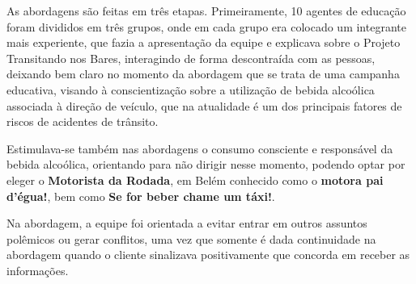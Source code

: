 As abordagens são feitas em três etapas. Primeiramente, 10 agentes de educação foram divididos em três grupos, onde em cada grupo era colocado um integrante mais experiente, que fazia a apresentação da equipe e explicava sobre o Projeto Transitando nos Bares, interagindo de forma descontraída com as pessoas, deixando bem claro no momento da abordagem que se trata de uma campanha educativa, visando à conscientização sobre a utilização de bebida alcoólica associada à direção de veículo, que na atualidade é um dos principais fatores de riscos de acidentes de trânsito. \vskip0.3cm

Estimulava-se também nas abordagens o consumo consciente e responsável da bebida alcoólica, orientando para não dirigir nesse momento, podendo optar por eleger o \textbf{Motorista da Rodada}, em Belém conhecido como o \textbf{motora pai d’égua!}, bem como \textbf{Se for beber chame um táxi!}.\vskip0.3cm 

Na abordagem, a equipe foi orientada a evitar entrar em outros assuntos polêmicos ou gerar conflitos, uma vez que somente é dada continuidade na abordagem quando o cliente sinalizava positivamente que concorda em receber as informações.







